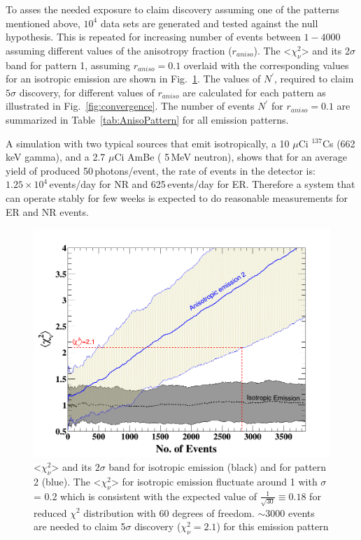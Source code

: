 To asses the needed exposure to claim discovery assuming one of the patterns mentioned above, $10^4$ data sets are generated and tested against the null hypothesis. This is repeated for increasing number of events between $1-4000$ assuming different values of the anisotropy fraction ($r_{aniso}$). The <$\chi^2_\nu$> 
and its 2$\sigma$ band for pattern 1, assuming $r_{aniso} =0.1$ overlaid with the corresponding values  for an isotropic emission are shown in Fig.~\ref{fig:pattern1}.  
The values of $N^{'}$, required to claim $5\sigma$ discovery, for different values of $r_{aniso}$ are calculated for each pattern as illustrated in Fig.~\ref{fig:convergence}.
The number of events 
$N^{'}$ for $r_{aniso} =0.1$ are summarized in Table~\ref{tab:AnisoPattern} for all emission patterns.

A simulation with two typical sources that emit isotropically, a 10 $\mu$Ci $^{137}$Cs (662\,keV gamma), and a 2.7 $\mu$Ci AmBe ( 5\,MeV neutron), shows that for an average yield of produced 
50\,photons/event,  the rate of events in the detector is: $1.25\times10^{4}$\,events/day for NR and 625\,events/day for ER. 
Therefore a system that can operate stably for few weeks 
is expected to do reasonable measurements for ER and NR events.


\begin{figure}[h]
\centerline{\includegraphics[width=0.5\linewidth]{Pattern1.png}}
\caption{<$\chi^2_\nu$> and its $2\sigma$ band for isotropic emission (black) and for pattern 2 (blue). The <$\chi^2_\nu$> for 
isotropic emission fluctuate around 1 with $\sigma$ = 0.2 which is consistent with 
the expected value of $\frac{1}{\sqrt{30}} \equiv 0.18$ for reduced $\chi^2$ distribution 
with 60 degrees of freedom. $\sim3000$ events are needed to claim  5$\sigma$ discovery ($\chi^2_\nu=2.1$) for this emission pattern}
\label{fig:pattern1}
\end{figure}

